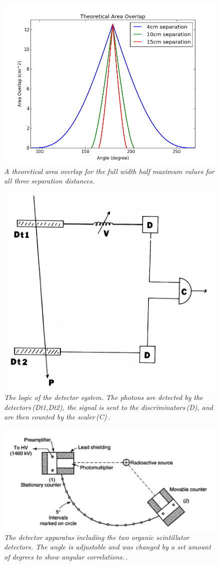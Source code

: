 \documentclass[aps,prl,twocolumn,superscriptaddress]{revtex4-1}
\begin{document}
\begin{figure}[h!]
  \begin{center}
\centerline{\includegraphics[width=3.in]{area.png}}
\caption{\it \small{A theoretical area overlap for the full width half maximum values for all three separation distances. \label{fig1}}}
  \end{center}
\end{figure}

\begin{figure}[h!]
  \begin{center}
\centerline{\includegraphics[width=3.in]{count.png}}
\caption{\it \small{The logic of the detector system. The photons are detected by the detectors\,(Dt1,Dt2), the signal is sent to the discriminators\,(D), and are then counted by the scaler\,(C)\,\cite{4}. \label{fig1}}}
  \end{center}
\end{figure}

\begin{figure}[h!]
  \begin{center}
\centerline{\includegraphics[width=3.in]{appar.png}}
\caption{\it \small{The detector apparatus including the two organic scintillator detectors. The angle is adjustable and was changed by a set amount of degrees to show angular correlations.\,\cite{3}. \label{fig1}}}
  \end{center}
\end{figure}
\end{document}
